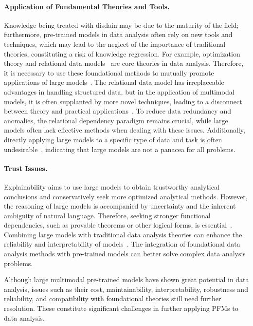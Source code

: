   \paragraph{Application of Fundamental Theories and Tools.} Knowledge being treated with disdain may be due to the maturity of the field; furthermore, pre-trained models in data analysis often rely on new tools and techniques, which may lead to the neglect of the importance of traditional theories, constituting a risk of knowledge regression. For example, optimization theory and relational data models~\cite{codd2007relational} are core theories in data analysis. Therefore, it is necessary to use these foundational methods to mutually promote applications of large models~\cite{li2024can}. The relational data model has irreplaceable advantages in handling structured data, but in the application of multimodal models, it is often supplanted by more novel techniques, leading to a disconnect between theory and practical applications~\cite{dinh2024large}. To reduce data redundancy and anomalies, the relational dependency paradigm remains crucial, while large models often lack effective methods when dealing with these issues. Additionally, directly applying large models to a specific type of data and task is often undesirable~\cite{tan2024language}, indicating that large models are not a panacea for all problems.
  
  \paragraph{Trust Issues.} Explainability aims to use large models to obtain trustworthy analytical conclusions and conservatively seek more optimized analytical methods. However, the reasoning of large models is accompanied by uncertainty and the inherent ambiguity of natural language. Therefore, seeking stronger functional dependencies, such as provable theorems or other logical forms, is essential~\cite{morishita2023learning,pei2023can,abbe2023generalization,yang2024leandojo}. Combining large models with traditional data analysis theories can enhance the reliability and interpretability of models~\cite{khakhar2023pac}. The integration of foundational data analysis methods with pre-trained models can better solve complex data analysis problems.
  
  Although large multimodal pre-trained models have shown great potential in data analysis, issues such as their cost, maintainability, interpretability, robustness and reliability, and compatibility with foundational theories still need further resolution. These constitute significant challenges in further applying PFMs to data analysis.
  
